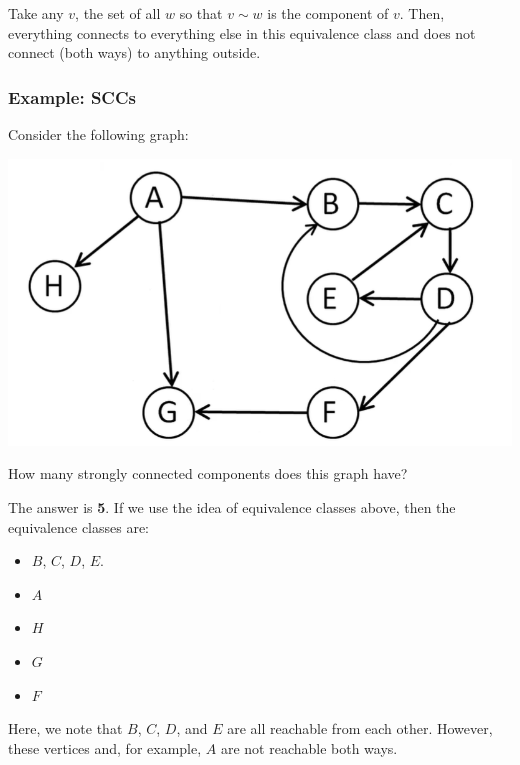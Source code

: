 \documentclass[letterpaper]{article}
\begin{document}
\bigskip 

Take any $v$, the set of all $w$ so that $v \sim w$ is the component of $v$. Then, everything connects to everything else in this equivalence class and does not connect (both ways) to anything outside. 

\subsubsection{Example: SCCs}
Consider the following graph:
\begin{center}
    \includegraphics[scale=0.4]{assets/scc.png}
\end{center}
How many strongly connected components does this graph have? 

\begin{mdframed}[]
    The answer is \textbf{5}. If we use the idea of equivalence classes above, then the equivalence classes are: 
    \begin{itemize}
        \item $B$, $C$, $D$, $E$. 
        \item $A$
        \item $H$
        \item $G$
        \item $F$
    \end{itemize}
    Here, we note that $B$, $C$, $D$, and $E$ are all reachable from each other. However, these vertices and, for example, $A$ are not reachable both ways. 
\end{mdframed}
\end{document}

